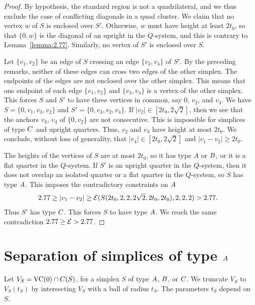 \begin{proof}
By hypothesis, the standard region is not a quadrilateral, and we
thus exclude the case of conflicting diagonals in a quad cluster.
We claim that no vertex $w$ of $S$ is enclosed over $S'$.
Otherwise, $w$ must have height at least $2t_0$, so that $\{0,w\}$
is the diagonal of an upright in the $Q$-system, and this is
contrary to Lemma~\ref{lemma:2.77}. Similarly, no vertex of $S'$
is enclosed over $S$.

Let $\{v_1,v_2\}$ be an edge of $S$ crossing an edge $\{v_3,v_4\}$ of
$S'$. By the preceding remarks, neither of these edges can cross
two edges of the other simplex. The endpoints of the edges are not
enclosed over the other simplex. This means that one endpoint of
each edge $\{v_1,v_2\}$ and $\{v_3,v_4\}$ is a vertex of the other
simplex.  This forces $S$ and $S'$ to have three vertices in
common, say $0$, $v_2$, and $v_3$.  We have $S=\{0,v_1,v_3,v_2\}$
and $S'=\{0,v_3,v_2,v_4\}$. If
    $|v_2|\in[2t_0,2\sqrt{2}]$,
then we see that the anchors $v_3$, $v_4$ of $\{0,v_2\}$ are not
consecutive.  This is impossible for simplices of type $C$ and
upright quarters.  Thus, $v_2$ and $v_3$ have height at most
$2t_0$.  We conclude, without loss of generality, that
    $|v_4|\in[2t_0,2\sqrt{2}]$
and $|v_1-v_2|\ge 2t_0$.

The heights of the vertices of $S$ are at most $2t_0$, so it has
type $A$ or $B$, or it is a flat quarter in the $Q$-system. If
$S'$ is an upright quarter in the $Q$-system, then it does not
overlap an isolated quarter or a flat quarter in the $Q$-system,
so $S$ has type $A$. This imposes the contradictory constraints
on $A$
    $$
    2.77\ge |v_1-v_2|\ge{\mathcal E}(S(2t_0,2,2,2\sqrt{2},2t_0,2t_0),2,2,2)>2.77.
    $$
Thus $S'$ has type $C$.  This forces $S$ to have type $A$.  We
reach the same contradiction  $2.77\ge {\mathcal E}>2.77$.
\end{proof}

\section{Separation of simplices of type $A$}
    \label{sec:separation}

Let $V_S = {\operatorname{VC}}(0)\cap C(S)$, for a simplex $S$ of type $A$,
$B$, or $C$. We truncate $V_S$ to $V_S(t_S)$ by intersecting
$V_S$ with a ball of radius $t_S$.  The parameters $t_S$ depend on
$S$.

